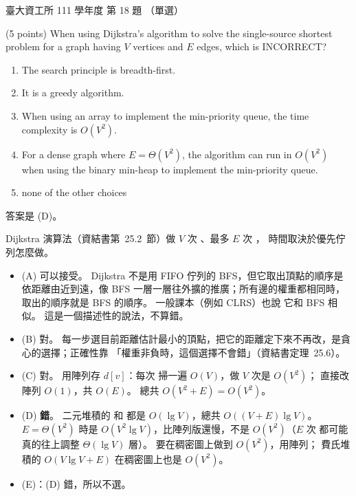 \begin{pastexam}[label={px:ntu-111-dsaa-18}]{臺大資工所 111 學年度 第 18 題}
（單選）

(5 points) When using Dijkstra's algorithm to solve the single-source shortest problem for a graph
having $V$ vertices and $E$ edges, which is INCORRECT?
\begin{enumerate}[label=(\Alph*)]
\item The search principle is breadth-first.
\item It is a greedy algorithm.
\item When using an array to implement the min-priority queue, the time complexity is $O(V^2)$.
\item For a dense graph where $E=\Theta(V^2)$, the algorithm can run in $O(V^2)$ when using the
binary min-heap to implement the min-priority queue.
\item none of the other choices
\end{enumerate}
\end{pastexam}

\begin{pastsoln}
答案是 (D)。

Dijkstra 演算法（資結書第~25.2~節）做 $V$ 次 、最多 $E$ 次 ，
時間取決於優先佇列怎麼做。
\begin{itemize}
\item (A) 可以接受。 Dijkstra 不是用 FIFO 佇列的 BFS，但它取出頂點的順序是依距離由近到遠，像 BFS
一層一層往外擴的推廣；所有邊的權重都相同時，取出的順序就是 BFS 的順序。 一般課本（例如 CLRS）也說
它和 BFS 相似。 這是一個描述性的說法，不算錯。
\item (B) 對。 每一步選目前距離估計最小的頂點，把它的距離定下來不再改，是貪心的選擇；正確性靠
「權重非負時，這個選擇不會錯」（資結書定理~25.6）。
\item (C) 對。 用陣列存 $d[v]$：每次  掃一遍 $O(V)$，做 $V$ 次是 $O(V^2)$；
 直接改陣列 $O(1)$，共 $O(E)$。 總共 $O(V^2 + E) = O(V^2)$。
\item (D) \textbf{錯}。 二元堆積的  和  都是 $O(\lg V)$，總共
$O((V + E)\lg V)$。 $E = \Theta(V^2)$ 時是 $O(V^2 \lg V)$，比陣列版還慢，不是 $O(V^2)$（$E$ 次
 都可能真的往上調整 $\Theta(\lg V)$ 層）。 要在稠密圖上做到 $O(V^2)$，用陣列；
費氏堆積的 $O(V \lg V + E)$ 在稠密圖上也是 $O(V^2)$。
\item (E)：(D) 錯，所以不選。
\end{itemize}
\end{pastsoln}
